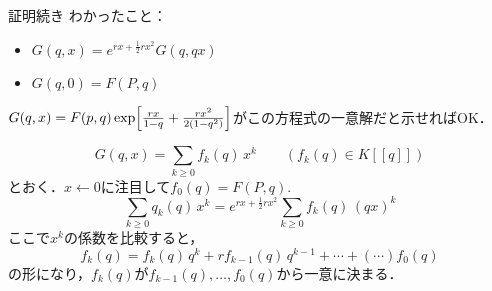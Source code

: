 \documentclass[aspectratio=98, 8pt, t]{beamer}
\renewcommand{\left}{\mleft}
\renewcommand{\right}{\mright}
\theoremstyle{definition}
\begin{document}
\begin{frame}{証明続き}
  わかったこと：
  \begin{itemize}
    \item $G(q,x) = e^{rx+\frac{1}{2}rx^2} G(q,qx)$
    \item $G(q,0) = F(P,q)$
  \end{itemize}
  $G(q,x) = F(p,q) \exp \left[ \frac{rx}{1-q} + \frac{rx^2}{2(1-q^2)} \right]$がこの方程式の一意解だと示せればOK．

  \pause
  \begin{equation*}
    G(q,x) = \sum_{k \geq 0} f_k(q) \, x^k \qquad (f_k(q) \in K[[q]])
  \end{equation*}
  とおく．$x \gets 0$に注目して$f_0(q) = F(P,q)$.
  \pause \begin{equation*}
    \sum_{k \geq 0} q_k(q) \, x^k = e^{rx+\frac{1}{2}rx^2} \sum_{k \geq 0} f_k(q) \, (qx)^k
  \end{equation*}
  \pause
  ここで$x^k$の係数を比較すると， \begin{equation*}
    f_k(q) = f_k(q) \, q^k + r f_{k-1}(q) \, q^{k-1} + \cdots + ({\cdots}) f_0(q)
  \end{equation*}
  の形になり，$f_k(q)$が$f_{k-1}(q),\ldots,f_0(q)$から一意に決まる．
\end{frame}
\end{document}
